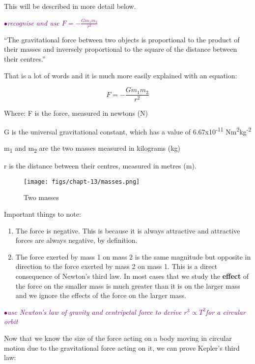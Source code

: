 \documentclass[a4paper,11pt,twoside]{memoir}
\newcounter{spec}[chapter]
\newcommand{\spec}[1]{\Needspace{5\baselineskip}\textcolor{purple}{$\bullet$\hspace{0.5cm}\textit{#1}}}
\begin{document}
This will be described in more detail below.


\spec{recognise and use $F=-\frac{Gm_1m_2}{r^2}$}

``The gravitational force between two objects is proportional to the
product of their masses and inversely proportional to the square of the
distance between their centres.''

That is a lot of words and it is much more easily explained with an
equation:

\[F = - \frac{Gm_{1}m_{2}}{r^{2}}\]

Where: F is the force, measured in newtons (N)

G is the universal gravitational constant, which has a value of
6.67x10\textsuperscript{-11} Nm\textsuperscript{2}kg\textsuperscript{-2}

m\textsubscript{1} and m\textsubscript{2} are the two masses measured in
kilograms (kg)

r is the distance between their centres, measured in metres (m).

\begin{figure}[h]
  \begin{center}
    \texttt{[image: figs/chapt-13/masses.png]}
  \end{center}
  \label{masses}
  \caption{Two masses}
\end{figure}

Important things to note:

\begin{enumerate}
\def\labelenumi{\arabic{enumi}.}
\item
  The force is negative. This is because it is always attractive and
  attractive forces are always negative, by definition.
\item
  The force exerted by mass 1 on mass 2 is the same magnitude but
  opposite in direction to the force exerted by mass 2 on mass 1. This
  is a direct consequence of Newton's third law. In most cases that we
  study the \textbf{effect} of the force on the smaller mass is much
  greater than it is on the larger mass and we ignore the effects of the
  force on the larger mass.
\end{enumerate}



\spec{use Newton’s law of gravity and centripetal force to derive $ r^3 \propto T^2 $for a circular orbit}

Now that we know the size of the force acting on a body moving in
circular motion due to the gravitational force acting on it, we can
prove Kepler's third law:
\end{document}
